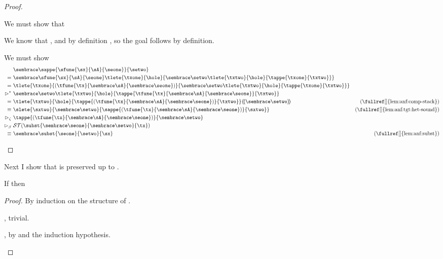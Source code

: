{\begin{proof}
\begin{proofcases}
      We must show that \im{\sequivjudg{\anfh{\slenv}}{\anfh{\sx}}{\anfh{\sepr}}}

      We know that \im{\sx = \sepr \in \slenv}, and by definition \im{\tx =
        \anfh{\sepr} \in \anfh{\slenv}}, so the goal follows by definition.

    \item \im{\sstepjudg[\step_{\beta}]{\slenv}{\sappe{\sfune{\sx}{\sA}{\seone}}{\setwo}}{\subst{\seone}{\setwo}{\sx}}}

      We must show \im{\sequivjudg{\anfh{\slenv}}{\anfh{\sappe{\sfune{\sx}{\sA}{\seone}}{\setwo}}}{\anfh{\subst{\seone}{\setwo}{\sx}}}}
      \begin{align}
        & \anfh{\sappe{\sfune{\sx}{\sA}{\seone}}{\setwo}} \nonumber \\
        =~& \anf{\sfune{\sx}{\sA}{\seone}}{\tlete{\txone}{\hole}{\anf{\setwo}{\tlete{\txtwo}{\hole}{\tappe{\txone}{\txtwo}}}}} \\
        =~&
        \tlete{\txone}{(\tfune{\tx}{\anfh{\sA}}{\anfh{\seone}})}{\anf{\setwo}{\tlete{\txtwo}{\hole}{\tappe{\txone}{\txtwo}}}}
        \\
        \stepstar~& \anf{\setwo}{\tlete{\txtwo}{\hole}{\tappe{\tfune{\tx}{\anfh{\sA}}{\anfh{\seone}}}{\txtwo}}} \\
        =~& \tlete{\txtwo}{\hole}{\tappe{(\tfune{\tx}{\anfh{\sA}}{\anfh{\seone}})}{\txtwo}}\hhw{\anfh{\setwo}}
        & \text{(\fullref[]{lem:anf:comp-stack})} \\
        \equiv~& \slete{\sxtwo}{\anfh{\setwo}}{\sappe{(\tfune{\tx}{\anfh{\sA}}{\anfh{\seone}})}{\sxtwo}}
        & \text{(\fullref[]{lem:anf:tgt:het-sound})} \\
        \step_{\zeta}~& \tappe{(\tfune{\tx}{\anfh{\sA}}{\anfh{\seone}})}{\anfh{\setwo}} \\
        \step_{\beta}~& \sbound{\subst{\anfh{\seone}}{\anfh{\setwo}}{\tx}} \\
        \equiv~& \anfh{\subst{\seone}{\setwo}{\sx}} & \text{(\fullref[]{lem:anf:subst})}
      \end{align}
  \end{proofcases}
\end{proof}

Next I show that  is preserved up to .
\begin{lemma}
  \label{lem:anf:red}
  If \im{\sstepjudg[\stepstar]{\slenv}{\se}{\sepr}} then \im{\sequivjudg{\anfh{\slenv}}{\anfh{\se}}{\anfh{\sepr}}}
\end{lemma}
\begin{proof}
  By induction on the structure of \im{\sstepjudg[\stepstar]{\slenv}{\se}{\sepr}}.
  \begin{proofcases}
  \item {}, trivial.
  \item {}, by  and the induction hypothesis.
  \item {}


\end{proofcases}
\end{proof}}
